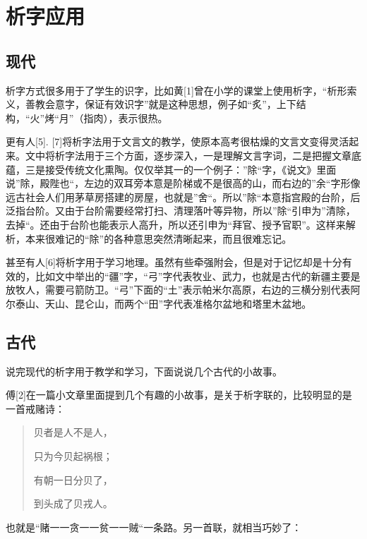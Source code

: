 \documentclass[]{article}
\begin{document}
\hypertarget{header-n282}{%
\section{析字应用}\label{header-n282}}

\hypertarget{header-n636}{%
\subsection{现代}\label{header-n636}}

析字方式很多用于了学生的识字，比如黄{[}1{]}曾在小学的课堂上使用析字，``析形索义，善教会意字，保证有效识字''就是这种思想，例子如``炙''，上下结构，``火''烤``月''（指肉），表示很热。

更有人{[}5{]}.
{[}7{]}将析字法用于文言文的教学，使原本高考很枯燥的文言文变得灵活起来。文中将析字法用于三个方面，逐步深入，一是理解文言字词，二是把握文章底蕴，三是接受传统文化熏陶。仅仅举其一的一个例子：''除``字，《说文》里面说''除，殿陛也``，左边的双耳旁本意是阶梯或不是很高的山，而右边的''余``字形像远古社会人们用茅草房搭建的房屋，也就是''舍``。所以''除``本意指宫殿的台阶，后泛指台阶。又由于台阶需要经常打扫、清理落叶等异物，所以''除``引申为''清除，去掉``。还由于台阶也能表示人高升，所以还引申为``拜官、授予官职''。这样来解析，本来很难记的``除''的各种意思突然清晰起来，而且很难忘记。

甚至有人{[}6{]}将析字用于学习地理。虽然有些牵强附会，但是对于记忆却是十分有效的，比如文中举出的``疆''字，``弓''字代表牧业、武力，也就是古代的新疆主要是放牧人，需要弓箭防卫。``弓''下面的``土''表示帕米尔高原，右边的三横分别代表阿尔泰山、天山、昆仑山，而两个``田''字代表准格尔盆地和塔里木盆地。

\hypertarget{header-n290}{%
\subsection{古代}\label{header-n290}}

说完现代的析字用于教学和学习，下面说说几个古代的小故事。

傅{[}2{]}在一篇小文章里面提到几个有趣的小故事，是关于析字联的，比较明显的是一首戒赌诗：

\begin{quote}
贝者是人不是人，

只为今贝起祸根；

有朝一日分贝了，

到头成了贝戎人。
\end{quote}

也就是``赌一一贪一一贫一一贼``一条路。另一首联，就相当巧妙了：
\end{document}
